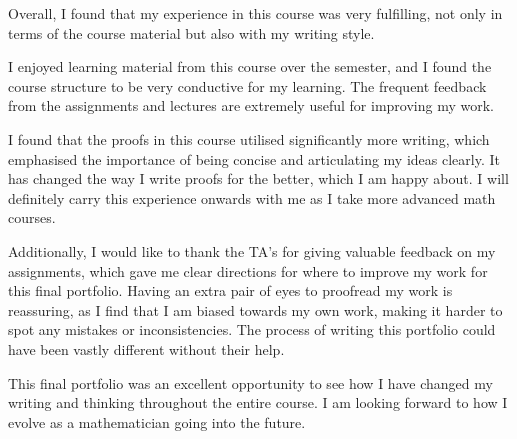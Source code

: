 \documentclass{eh-homework}
\begin{document}
    \begin{question}[title=Conclusion]{1}
        Overall, I found that my experience in this course was very fulfilling, not only in terms of the course material but also with my writing style.

    \smallskip

    I enjoyed learning material from this course over the semester, and I found the course structure to be very conductive for my learning. The frequent feedback from the assignments and lectures are extremely useful for improving my work.
    
    \smallskip
    
    I found that the proofs in this course utilised significantly more writing, which emphasised the importance of being concise and articulating my ideas clearly. It has changed the way I write proofs for the better, which I am happy about. I will definitely carry this experience onwards with me as I take more advanced math courses.

    \smallskip

    Additionally, I would like to thank the TA's for giving valuable feedback on my assignments, which gave me clear directions for where to improve my work for this final portfolio. Having an extra pair of eyes to proofread my work is reassuring, as I find that I am biased towards my own work, making it harder to spot any mistakes or inconsistencies. The process of writing this portfolio could have been vastly different without their help.

    \smallskip

    This final portfolio was an excellent opportunity to see how I have changed my writing and thinking throughout the entire course. I am looking forward to how I evolve as a mathematician going into the future.
    \end{question}
\end{document}
